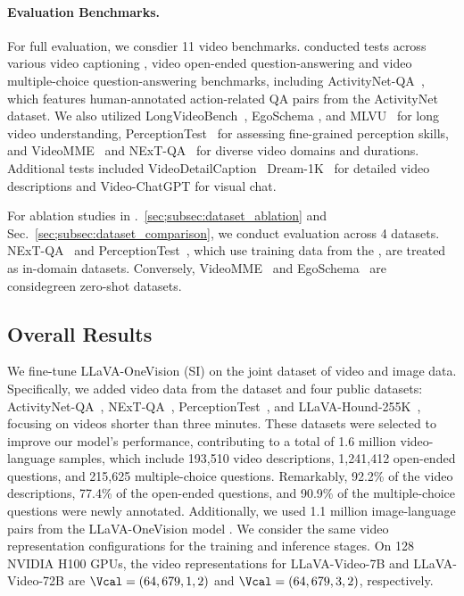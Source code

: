 \paragraph{Evaluation Benchmarks.} For full evaluation, we consdier 11 video benchmarks. conducted tests across various video captioning , video open-ended question-answering and video multiple-choice question-answering benchmarks, including ActivityNet-QA~\citep{yu2019activityqa}, which features human-annotated action-related QA pairs from the ActivityNet dataset. We also utilized LongVideoBench~\citep{wu2024longvideobench}, EgoSchema \citep{mangalam2024egoschema}, and MLVU~\citep{zhou2024mlvu} for long video understanding, PerceptionTest~\citep{patraucean2023perception} for assessing fine-grained perception skills, and VideoMME~\citep{fu2024videomme} and NExT-QA~\citep{xiao2021next} for diverse video domains and durations. Additional tests included VideoDetailCaption~\citep{videodetail2024} Dream-1K~\citep{wang2024tarsierrecipestrainingevaluating} for detailed video descriptions and Video-ChatGPT \citep{Maaz2023VideoChatGPT} for visual chat.

For ablation studies in .~\ref{sec;subsec:dataset_ablation} and Sec.~\ref{sec;subsec:dataset_comparison}, we conduct evaluation across 4 datasets. NExT-QA~\citep{xiao2021next} and PerceptionTest~\citep{patraucean2023perception}, which use training data from the \DataName{}, are treated as in-domain datasets. Conversely, VideoMME~\citep{fu2024videomme} and EgoSchema~\citep{mangalam2024egoschema} are considegreen zero-shot datasets. 

 \subsection{Overall Results}

We fine-tune LLaVA-OneVision (SI) on the joint dataset of video and image data. Specifically, we added video data from the \DataName{} dataset and four public datasets: 
ActivityNet-QA~\citep{yu2019activityqa}, NExT-QA~\citep{xiao2021next}, PerceptionTest~\citep{patraucean2023perception}, and LLaVA-Hound-255K~\citep{zhang2024direct}, focusing on videos shorter than three minutes. These datasets were selected to improve our model’s performance, contributing to a total of 1.6 million video-language samples, which include 193,510 video descriptions, 1,241,412 open-ended questions, and 215,625 multiple-choice questions. Remarkably, 92.2\% of the video descriptions, 77.4\% of the open-ended questions, and 90.9\% of the multiple-choice questions were newly annotated. Additionally, we used 1.1 million image-language pairs from the LLaVA-OneVision model \citep{li2024llavaonevision}. 
We consider the same video representation configurations for the training and inference stages. On 128 NVIDIA H100 GPUs, the video representations for LLaVA-Video-7B and LLaVA-Video-72B are $\Vcal = (64, 679, 1, 2)$ and $\Vcal = (64, 679, 3, 2)$, respectively.

